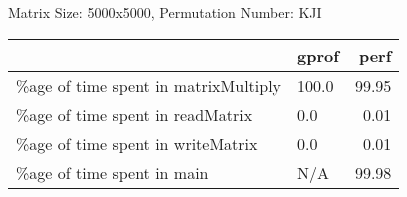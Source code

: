 \documentclass{article}
\begin{document}
    Matrix Size: 5000x5000, Permutation Number: KJI \\
    \begin{tabular}{llr}
\hline
                                      & gprof   &   perf \\
\hline
 \%age of time spent in matrixMultiply & 100.0   &  99.95 \\
 \%age of time spent in readMatrix     & 0.0     &   0.01 \\
 \%age of time spent in writeMatrix    & 0.0     &   0.01 \\
 \%age of time spent in main           & N/A     &  99.98 \\
\hline
\end{tabular}
    
\end{document}
